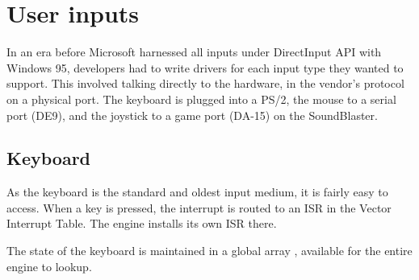 \section{User inputs}
In an era before Microsoft harnessed all inputs under DirectInput API with Windows 95, developers had to write drivers for each input type they wanted to support. This involved talking directly to the hardware, in the vendor's protocol on a physical port. The keyboard is plugged into a PS/2, the mouse to a serial port (DE9), and the joystick to a game port (DA-15) on the SoundBlaster.





\subsection{Keyboard}

As the keyboard is the standard and oldest input medium, it is fairly easy to access. When a key is pressed, the interrupt is routed to an ISR in the Vector Interrupt Table. The engine installs its own ISR there.


\par
\begin{minipage}{\textwidth}

\end{minipage}

The state of the keyboard is maintained in a global array , available for the entire engine to lookup.\\
\par

\begin{minipage}{\textwidth}

\end{minipage}



